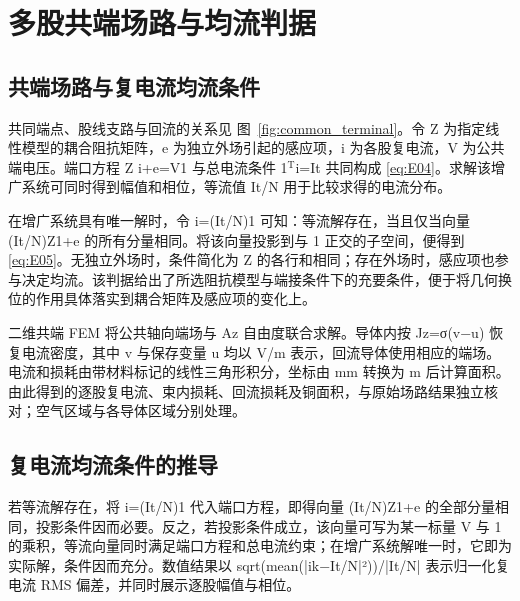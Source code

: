 \section{多股共端场路与均流判据}
\label{chapter:04}

\hypertarget{04.common.heading}{}
\subsection{共端场路与复电流均流条件}

\hypertarget{04.common.p1}{}
共同端点、股线支路与回流的关系见 图~\ref{fig:common_terminal}。令 Z 为指定线性模型的耦合阻抗矩阵，e 为独立外场引起的感应项，i 为各股复电流，V 为公共端电压。端口方程 Z i+e=V1 与总电流条件 1\(^{\mathrm T}\)i=It 共同构成 \eqref{eq:E04}。求解该增广系统可同时得到幅值和相位，等流值 It/N 用于比较求得的电流分布。

\hypertarget{04.common.p2}{}
在增广系统具有唯一解时，令 i=(It/N)1 可知：等流解存在，当且仅当向量 (It/N)Z1+e 的所有分量相同。将该向量投影到与 1 正交的子空间，便得到 \eqref{eq:E05}。无独立外场时，条件简化为 Z 的各行和相同；存在外场时，感应项也参与决定均流。该判据给出了所选阻抗模型与端接条件下的充要条件，便于将几何换位的作用具体落实到耦合矩阵及感应项的变化上。

\hypertarget{04.common.p3}{}
二维共端 FEM 将公共轴向端场与 Az 自由度联合求解。导体内按 Jz=σ(v−u) 恢复电流密度，其中 v 与保存变量 u 均以 V/m 表示，回流导体使用相应的端场。电流和损耗由带材料标记的线性三角形积分，坐标由 mm 转换为 m 后计算面积。由此得到的逐股复电流、束内损耗、回流损耗及铜面积，与原始场路结果独立核对；空气区域与各导体区域分别处理。

\hypertarget{04.sharing_derivation.heading}{}
\subsection{复电流均流条件的推导}

\hypertarget{04.sharing_derivation.p1}{}
若等流解存在，将 i=(It/N)1 代入端口方程，即得向量 (It/N)Z1+e 的全部分量相同，投影条件因而必要。反之，若投影条件成立，该向量可写为某一标量 V 与 1 的乘积，等流向量同时满足端口方程和总电流约束；在增广系统解唯一时，它即为实际解，条件因而充分。数值结果以 sqrt(mean(|ik−It/N|²))/|It/N| 表示归一化复电流 RMS 偏差，并同时展示逐股幅值与相位。

\hypertarget{04.coax_results.heading}{}
